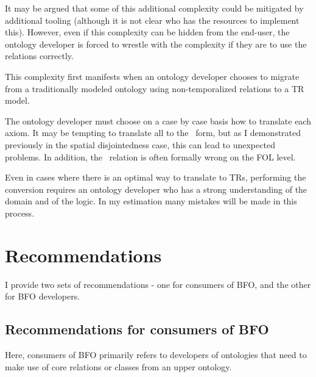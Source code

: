 \documentclass{bioinfo}
\def\atAllTimes{\pr{at-all-times}}
\begin{document}
It may be argued that some of this additional complexity could be
mitigated by additional tooling (although it is not clear who has the
resources to implement this). However, even if this complexity can be
hidden from the end-user, the ontology developer is forced to wrestle with
the complexity if they are to use the relations correctly.

This complexity first manifests when an ontology developer chooses to
migrate from a traditionally modeled ontology using non-temporalized
relations to a TR model.

The ontology developer must choose on a case by case basis how to
translate each axiom. It may be tempting to translate all to the
\atAllTimes\ form, but as I demonstrated previously in the spatial
disjointedness case, this can lead to unexpected problems. In
addition, the \atAllTimes\ relation is often formally wrong on the FOL
level.

Even in cases where there is an optimal way to translate to TRs,
performing the conversion requires an ontology developer who has a
strong understanding of the domain and of the logic. In my estimation
many mistakes will be made in this process.

\section{Recommendations}

I provide two sets of recommendations - one for consumers of BFO, and
the other for BFO developers.

\subsection{Recommendations for consumers of BFO}

Here, consumers of BFO primarily refers to developers of ontologies
that need to make use of core relations or classes from an upper
ontology.
\end{document}
